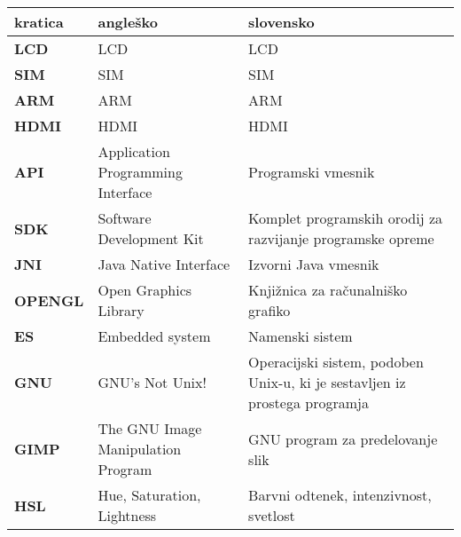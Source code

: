 \begin{tabular}{l|p{5cm}|p{6cm}}
  {\bf kratica} & {\bf angleško} & {\bf slovensko} \\ \hline
  {\bf LCD} & LCD & LCD \\
  {\bf SIM} & SIM & SIM \\
  {\bf ARM} & ARM & ARM \\
  {\bf HDMI} & HDMI & HDMI \\
  {\bf API} & Application Programming Interface & Programski vmesnik \\
  {\bf SDK} & Software Development Kit & Komplet programskih orodij za razvijanje programske opreme \\
  {\bf JNI} & Java Native Interface & Izvorni Java vmesnik \\
  {\bf OPENGL} & Open Graphics Library & Knjižnica za računalniško grafiko \\
  {\bf ES} & Embedded system & Namenski sistem \\
  {\bf GNU} & GNU's Not Unix! & Operacijski sistem, podoben Unix-u, ki je sestavljen iz prostega programja \\
  {\bf GIMP} & The GNU Image Manipulation Program & GNU program za predelovanje slik \\
  {\bf HSL} & Hue, Saturation, Lightness & Barvni odtenek, intenzivnost, svetlost
\end{tabular}
